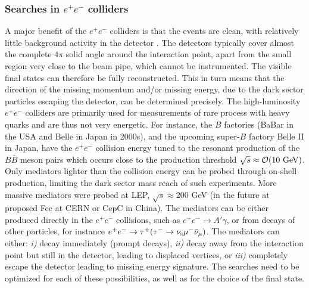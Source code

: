 \subsubsection{Searches in $e^+e^-$ colliders} 
A major benefit of the $e^+e^-$ colliders is that the events are clean, with relatively little background activity in the detector \cite{dark:sector:e+e-}. 
The detectors typically cover almost the complete $4\pi$ solid angle around the interaction point, apart from the small region very close to the beam pipe,  which cannot be instrumented.  The visible final states can therefore be fully reconstructed. This in turn means  that  the direction of the missing momentum and/or missing energy, due to the dark sector particles escaping the detector, can be determined precisely. The high-luminosity $e^+e^-$ colliders are primarily used for measurements of rare process with heavy quarks and are thus not very energetic. For instance, the $B$ factories ({\sc BaBar} in the USA and {\sc Belle} in Japan in 2000s), and the upcoming super-$B$ factory {\sc Belle II} in Japan, have the $e^+e^-$ collision energy tuned to the resonant production of the $B\bar B$ meson pairs which occurs close to the production threshold $\sqrt{s}\approx {\mathcal O}(10{\rm~GeV})$. Only mediators lighter than the collision energy can be probed through on-shell production, limiting the dark sector mass reach of such experiments. More massive mediators were probed at LEP, $\sqrt{s}\approx 200$ GeV (in the future at proposed {\sc Fcc} at CERN or {\sc CepC} in China). The mediators can be either produced directly in the $e^+e^-$ collisions, such as $e^+e^-\to A'\gamma$, or from decays of other particles, for instance $e^+e^-\to \tau^+(\tau^-\to \nu_{\rm s} \mu^-\bar \nu_\mu)$. The mediators can either: {\em i)} decay immediately (prompt decays),  {\em ii)} decay away from the interaction point but still in the detector, leading to displaced vertices, or {\em iii)} completely escape the detector leading to missing energy signature. The searches need to be optimized for each of these possibilities, as well as for the choice of the final state. 


